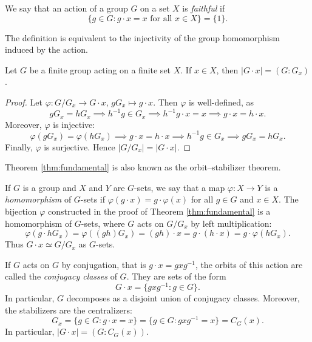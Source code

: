 \begin{definition}
We say that an action of a group $G$ on a set 
$X$ is \emph{faithful} if 
\[
\{g\in G:g\cdot x=x\text{ for all $x\in X$}\}=\{1\}.
\]
\end{definition}

The definition is equivalent to the injectivity of 
the group homomorphism induced
by the action. 

\begin{theorem}
\label{thm:fundamental}
Let $G$ be a finite group acting on a finite set $X$. If 
$x\in X$, then $|G\cdot x|=(G:G_x)$.
\end{theorem}

\begin{proof}
    Let $\varphi\colon G/G_x\to G\cdot x$, $gG_x\mapsto g\cdot x$. Then $\varphi$ is well-defined, as 
        \[
        gG_x=hG_x\implies h^{-1}g\in G_x
        \implies h^{-1}g\cdot x=x\implies g\cdot x=h\cdot x.
        \]
    Moreover, $\varphi$ is injective: 
        \[
        \varphi(gG_x)=\varphi(hG_x)\implies
        g\cdot x=h\cdot x\implies
        h^{-1}g\in G_x\implies gG_x=hG_x.
        \]
    Finally, $\varphi$ is surjective. Hence 
    $|G/G_x|=|G\cdot x|$.
\end{proof}

Theorem \ref{thm:fundamental} is also known 
as the orbit--stabilizer theorem. 

If $G$ is a group and $X$ and $Y$ are $G$-sets, 
we say that a map $\varphi\colon X\to Y$ is a 
\emph{homomorphism} of $G$-sets if $\varphi(g\cdot x)=g\cdot \varphi(x)$ for all $g\in G$ and $x\in X$. The bijection 
$\varphi$ constructed in the proof of Theorem \ref{thm:fundamental}
is a homomorphism of $G$-sets, where
$G$ acts on $G/G_x$ by left multiplication: 
\[
\varphi(g\cdot hG_x)=\varphi((gh)G_x)=(gh)\cdot x=g\cdot (h\cdot x)=g\cdot\varphi(hG_x).
\]
Thus $G\cdot x\simeq G/G_x$ as $G$-sets.

\begin{example}
    If $G$ acts on $G$ by conjugation, that is $g\cdot x=gxg^{-1}$, the orbits of this action are called the \emph{conjugacy classes} 
    of $G$. They are sets of the form
        \[
        G\cdot x=\{gxg^{-1}:g\in G\}.
        \]
    In particular, $G$ decomposes as a disjoint union of conjugacy classes. Moreover, 
    the stabilizers are the centralizers:
        \[
        G_x=\{g\in G:g\cdot x=x\}=\{g\in G:gxg^{-1}=x\}=C_G(x).
        \]
    In particular, $|G\cdot x|=(G:C_G(x))$.
\end{example}

